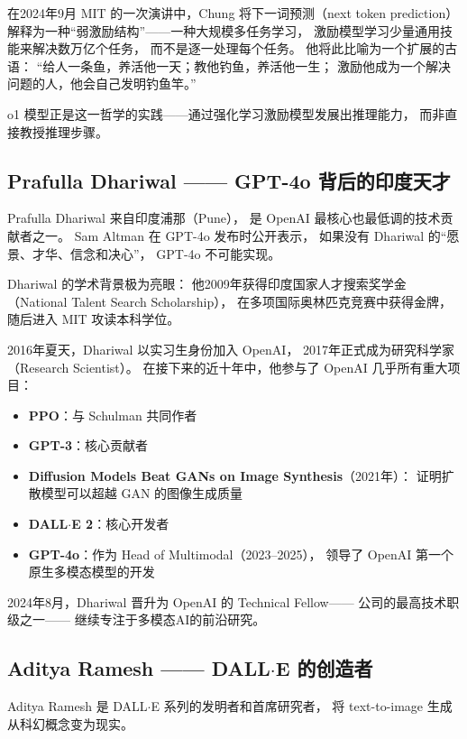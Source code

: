 在2024年9月 MIT 的一次演讲中，Chung 将下一词预测（next token prediction）
解释为一种``弱激励结构''——一种大规模多任务学习，
激励模型学习少量通用技能来解决数万亿个任务，
而不是逐一处理每个任务。
他将此比喻为一个扩展的古语：
``给人一条鱼，养活他一天；教他钓鱼，养活他一生；
激励他成为一个解决问题的人，他会自己发明钓鱼竿。''

o1 模型正是这一哲学的实践——通过强化学习激励模型发展出推理能力，
而非直接教授推理步骤。


\subsection{Prafulla Dhariwal —— GPT-4o 背后的印度天才}
\label{subsec:prafulla-dhariwal}

Prafulla Dhariwal 来自印度浦那（Pune），
是 OpenAI 最核心也最低调的技术贡献者之一。
Sam Altman 在 GPT-4o 发布时公开表示，
如果没有 Dhariwal 的``愿景、才华、信念和决心''，
GPT-4o 不可能实现。

Dhariwal 的学术背景极为亮眼：
他2009年获得印度国家人才搜索奖学金（National Talent Search Scholarship），
在多项国际奥林匹克竞赛中获得金牌，
随后进入 MIT 攻读本科学位。

2016年夏天，Dhariwal 以实习生身份加入 OpenAI，
2017年正式成为研究科学家（Research Scientist）。
在接下来的近十年中，他参与了 OpenAI 几乎所有重大项目：

\begin{itemize}[noitemsep]
  \item \textbf{PPO}：与 Schulman 共同作者
  \item \textbf{GPT-3}：核心贡献者
  \item \textbf{Diffusion Models Beat GANs on Image Synthesis}（2021年）：
        证明扩散模型可以超越 GAN 的图像生成质量
  \item \textbf{DALL$\cdot$E 2}：核心开发者
  \item \textbf{GPT-4o}：作为 Head of Multimodal（2023--2025），
        领导了 OpenAI 第一个原生多模态模型的开发
\end{itemize}

2024年8月，Dhariwal 晋升为 OpenAI 的 Technical Fellow——
公司的最高技术职级之一——
继续专注于多模态AI的前沿研究。


\subsection{Aditya Ramesh —— DALL$\cdot$E 的创造者}
\label{subsec:aditya-ramesh}

Aditya Ramesh 是 DALL$\cdot$E 系列的发明者和首席研究者，
将 text-to-image 生成从科幻概念变为现实。

